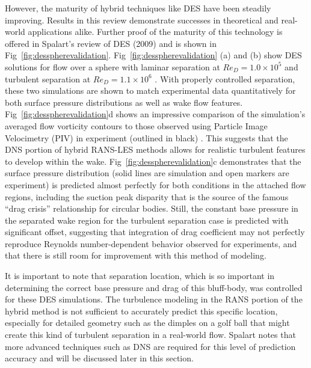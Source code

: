 \documentclass[journal]{new-aiaa}
\begin{document}
However, the maturity of hybrid techniques like DES have been steadily improving.  Results in this review demonstrate successes in theoretical and real-world applications alike. Further proof of the maturity of this technology is offered in Spalart's review of DES (2009) \cite{spalart2009detachededdy} and is shown in Fig~\ref{fig:desspherevalidation}. Fig~\ref{fig:desspherevalidation} (a) and (b) show DES solutions for flow over a sphere with laminar separation at $Re_D = 1.0 \times 10^5$ and turbulent separation at $Re_D = 1.1 \times 10^6$ \cite{squires2004detachededdy}. With properly controlled separation, these two simulations are shown to match experimental data quantitatively for both surface pressure distributions as well as wake flow features. Fig~\ref{fig:desspherevalidation}d shows an impressive comparison of the simulation's averaged flow vorticity contours to those observed using Particle Image Velocimetry (PIV) in experiment (outlined in black) \cite{mockett2008demonstration}. This suggests that the DNS portion of hybrid RANS-LES methods allows for realistic turbulent features to develop within the wake. Fig~\ref{fig:desspherevalidation}c demonstrates that the surface pressure distribution (solid lines are simulation and open markers are experiment) is predicted almost perfectly for both conditions in the attached flow regions, including the suction peak disparity that is the source of the famous ``drag crisis'' relationship for circular bodies. Still, the constant base pressure in the separated wake region for the turbulent separation case is predicted with significant offset, suggesting that integration of drag coefficient may not perfectly reproduce Reynolds number-dependent behavior observed for experiments, and that there is still room for improvement with this method of modeling.

It is important to note that separation location, which is so important in determining the correct base pressure and drag of this bluff-body, was controlled for these DES simulations. The turbulence modeling in the RANS portion of the hybrid method is not sufficient to accurately predict this specific location, especially for detailed geometry such as the dimples on a golf ball that might create this kind of turbulent separation in a real-world flow. Spalart notes that more advanced techniques such as DNS are required for this level of prediction accuracy and will be discussed later in this section.
\end{document}
